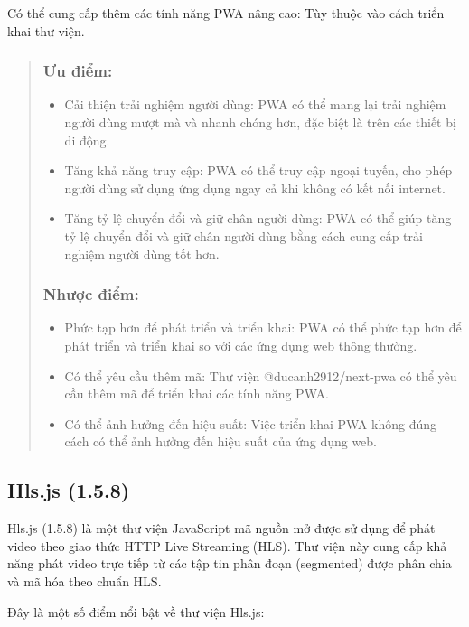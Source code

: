 Có thể cung cấp thêm các tính năng PWA nâng cao: Tùy thuộc vào cách triển khai thư viện.
\begin{quote}
\subsubsection{Ưu điểm:}
\begin{itemize}
    \item Cải thiện trải nghiệm người dùng: PWA có thể mang lại trải nghiệm người dùng mượt mà và nhanh chóng hơn, đặc biệt là trên các thiết bị di động.
    \item Tăng khả năng truy cập: PWA có thể truy cập ngoại tuyến, cho phép người dùng sử dụng ứng dụng ngay cả khi không có kết nối internet.
    \item Tăng tỷ lệ chuyển đổi và giữ chân người dùng: PWA có thể giúp tăng tỷ lệ chuyển đổi và giữ chân người dùng bằng cách cung cấp trải nghiệm người dùng tốt hơn.
\end{itemize}

\subsubsection{Nhược điểm:}
\begin{itemize}
    \item Phức tạp hơn để phát triển và triển khai: PWA có thể phức tạp hơn để phát triển và triển khai so với các ứng dụng web thông thường.
    \item Có thể yêu cầu thêm mã: Thư viện @ducanh2912/next-pwa có thể yêu cầu thêm mã để triển khai các tính năng PWA.
    \item Có thể ảnh hưởng đến hiệu suất: Việc triển khai PWA không đúng cách có thể ảnh hưởng đến hiệu suất của ứng dụng web.
\end{itemize}
\end{quote}

\subsection{Hls.js (1.5.8)}
Hls.js (1.5.8) là một thư viện JavaScript mã nguồn mở được sử dụng để phát video theo giao thức HTTP Live Streaming (HLS). Thư viện này cung cấp khả năng phát video trực tiếp từ các tập tin phân đoạn (segmented) được phân chia và mã hóa theo chuẩn HLS.

Đây là một số điểm nổi bật về thư viện Hls.js:

